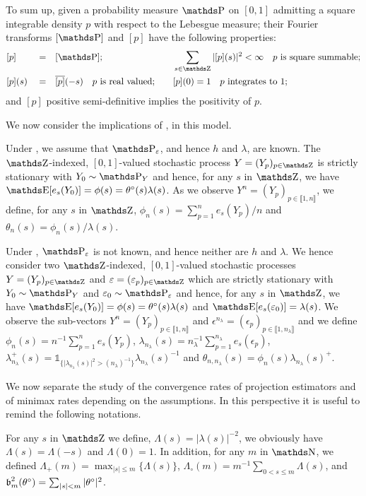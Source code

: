 To sum up, given a probability measure $\P$ on $[0, 1]$ admitting a square integrable density $p$ with respect to the Lebesgue measure; their Fourier transforms $[\P]$ and $[p]$ have the following properties:
\begin{alignat*}{4}
& [p] && = && [\P]; \quad &&\sum_{s \in \Z}\vert[p](s)\vert^{2} < \infty \quad p \text{ is square summable};\\ 
& [p](s) && = && \overline{[p]}(-s) \quad p \text{ is real valued;} \quad && [p](0) = 1 \quad p \text{ integrates to } 1;
\end{alignat*}
and $[p]$ positive semi-definitive implies the positivity of $p$.

\medskip

We now consider the implications of ,  in this model.

Under , we assume that $\P_{\epsilon}$, and hence $h$ and $\lambda$, are known.
The $\Z$-indexed, $[0, 1]$-valued stochastic process $Y = (Y_{p})_{p \in \Z}$ is strictly stationary with $Y_{0} \sim \P_{Y}$ and hence, for any $s$ in $\Z$, we have $\E[e_{s}(Y_{0})] = \phi(s) = \theta^{\circ}(s) \lambda(s)$.
As we observe $Y^{n} = (Y_{p})_{p \in \llbracket 1, n \rrbracket}$, we define, for any $s$ in $\Z$, $\phi_{n}(s) = \sum_{p = 1}^{n} e_{s}(Y_{p}) / n$ and $\theta_{n}(s) = \phi_{n}(s) / \lambda(s)$.

Under , $\P_{\epsilon}$ is not known, and hence neither are $h$ and $\lambda$.
We hence consider two $\Z$-indexed, $[0, 1]$-valued stochastic processes $Y = (Y_{p})_{p \in \Z}$ and $\epsilon = (\epsilon_{p})_{p \in \Z}$ which are strictly stationary with $Y_{0} \sim \P_{Y}$ and $\epsilon_{0} \sim \P_{\epsilon}$ and hence, for any $s$ in $\Z$, we have $\E[e_{s}(Y_{0})] = \phi(s) = \theta^{\circ}(s) \lambda(s)$ and $\E[e_{s}(\epsilon_{0})] = \lambda(s)$.
We observe the sub-vectors $Y^{n} = (Y_{p})_{p \in \llbracket 1, n \rrbracket}$ and $\epsilon^{n_{\lambda}} = (\epsilon_{p})_{p \in \llbracket 1, n_{\lambda} \rrbracket}$ and we define $\phi_{n}(s) = n^{-1} \sum_{p = 1}^{n} e_{s}(Y_{p})$, $\lambda_{n_{\lambda}}(s) = n_{\lambda}^{-1}\sum_{p = 1}^{n_{\lambda}} e_{s}(\epsilon_{p})$, $\lambda_{n_{\lambda}}^{+}(s) = \mathds{1}_{\{\vert \lambda_{n_{\lambda}}(s) \vert^{2} > (n_{\lambda})^{-1}\}} \lambda_{n_{\lambda}}(s)^{-1}$ and $\theta_{n, n_{\lambda}}(s) = \phi_{n}(s) \lambda_{n_{\lambda}}(s)^{+}$.

We now separate the study of the convergence rates of projection estimators and of minimax rates depending on the assumptions.
In this perspective it is useful to remind the following notations.
\begin{nota}
For any $s$ in $\Z$ we define, $\Lambda(s) = \vert \lambda(s) \vert^{-2}$, we obviously have $\Lambda(s) = \Lambda(-s)$ and $\Lambda(0) = 1$.
In addition, for any $m$ in $\N$, we defined $\Lambda_{+}(m) = \max_{\vert s \vert \leq m} \{\Lambda(s)\}$, $\Lambda_{\circ}(m) = m^{-1} \sum_{0 < s \leq m} \Lambda(s)$, and $\operatorname{\mathfrak{b}}_{m}^{2}(\theta^{\circ}) = \sum_{\vert s \vert < m} \vert \theta^{\circ} \vert^{2}$.
\end{nota}

